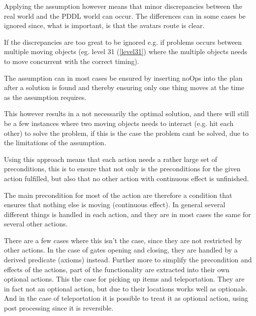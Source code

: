 		Applying the assumption however means that minor discrepancies between the real world and the PDDL world can occur. The differences can in some cases be ignored since, what is important, is that the avatars route is clear. 

		If the discrepancies are too great to be ignored e.g. if problems occurs between multiple moving objects (eg. level 31 (\ref{level31}) where the multiple objects needs to move concurrent with the correct timing). 

		The assumption can in most cases be ensured by inserting noOps into the plan after a solution is found and thereby ensuring only one thing moves at the time as the assumption requires. 

		This however results in a not necessarily the optimal solution, and there will still be a few instances where two moving objects needs to interact (e.g. hit each other) to solve the problem, if this is the case the problem cant be solved, due to the limitations of the assumption.
			
		Using this approach means that each action needs a rather large set of preconditions, this is to ensure that not only is the preconditions for the given action fulfilled, but also that no other action with continuous effect is unfinished. 

		The main precondition for most of the action are therefore a condition that ensures that nothing else is moving (continuous effect). In general several different things is handled in each action, and they are in most cases the same for several other actions. %
		
		There are a few cases where this isn't the case, since they are not restricted by other actions. In the case of gates opening and closing, they are handled by a derived predicate (axioms) instead. 
		Further more to simplify the precondition and effects of the actions, part of the functionality are extracted into their own optional actions. This the case for picking up items and teleportation. They are in fact not an optional action, but due to their locations works well as optionals. And in the case of teleportation it is possible to treat it as optional action, using post processing since it is reversible.
		
